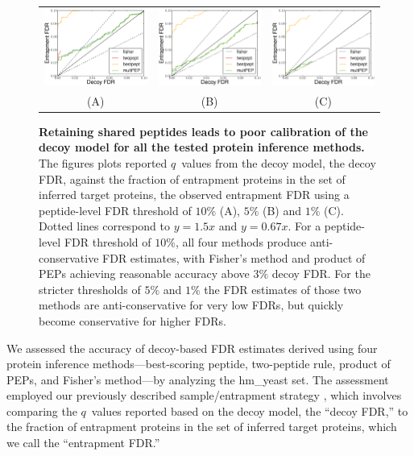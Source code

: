 \documentclass{article}
\begin{document}
\begin{figure}
\begin{center}
\begin{tabular}{ccc} 
\includegraphics[width=0.3\linewidth]
  {./img/shared-pept-accuracy-fdr10} &
\includegraphics[width=0.3\linewidth]
  {./img/shared-pept-accuracy-fdr5} & 
\includegraphics[width=0.3\linewidth]
  {./img/shared-pept-accuracy-fdr1}\\
(A) & (B) & (C)
\end{tabular}
\caption{\label{fig:shared-accuracy}\textbf{Retaining shared peptides
    leads to poor calibration of the decoy model for all the tested
    protein inference methods.} The figures plots reported $q$~values
  from the decoy model, the decoy FDR, against the fraction of
  entrapment proteins in the set of inferred target proteins, the
  observed entrapment FDR using a peptide-level FDR threshold of
  $10\%$ (A), $5\%$ (B) and $1\%$ (C). Dotted lines correspond to
  $y=1.5x$ and $y=0.67x$.  For a peptide-level FDR threshold of
  $10\%$, all four methods produce anti-conservative FDR estimates,
  with Fisher's method and product of PEPs achieving reasonable
  accuracy above $3\%$ decoy FDR. For the stricter thresholds of $5\%$
  and $1\%$ the FDR estimates of those two methods are
  anti-conservative for very low FDRs, but quickly become conservative
  for higher FDRs.}
\end{center}
\end{figure}

We assessed the accuracy of decoy-based FDR estimates derived using
four protein inference methods---best-scoring peptide, two-peptide
rule, product of PEPs, and Fisher's method---by analyzing the
hm\_yeast set.  The assessment employed our previously described
sample/entrapment strategy \cite{granholm2013determining}, which
involves comparing the $q$~values reported based on the decoy model,
the ``decoy FDR,'' to the fraction of entrapment proteins in the set
of inferred target proteins, which we call the ``entrapment FDR.''
\end{document}
